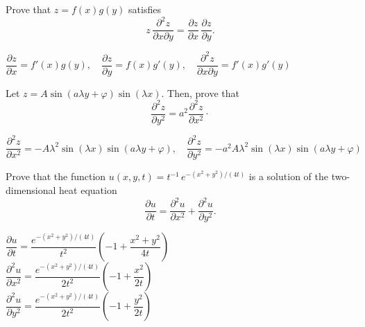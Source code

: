 \ifanalysis

\begin{Exercise}[difficulty = 3] Prove that $z=f(x)g(y)$ satisfies
$$z\, \dfrac{\partial^2 z}{\partial x \partial y} = \dfrac{\partial z}{\partial x }\,  \dfrac{\partial z}{\partial y }. $$ 
\end{Exercise}

\begin{Answer}

    $\dfrac{\partial z}{\partial x } = f'(x)g(y), \quad  \dfrac{\partial z}{\partial y } = f(x)g'(y), \quad \dfrac{\partial^2 z}{\partial x \partial y} = f'(x)g'(y)$
\end{Answer}

\ifanalysis\pagebreak\fi
\begin{Exercise}[difficulty = 3] Let $z = A\sin (a\lambda y+\varphi)\sin (\lambda x)$. Then, prove that
$$\dfrac{\partial^2 z}{\partial y^2}=a^2\dfrac{\partial^2 z}{\partial x^2}\cdot$$  
\end{Exercise}

\begin{Answer}
    $\dfrac{\partial^2 z}{\partial x^2} = -A \lambda^2 \sin \left(\lambda x \right)\sin (a\lambda y+\varphi), \quad \dfrac{\partial^2 z}{\partial y^2}= -a^2 A \lambda^2\sin \left(\lambda x \right)\sin (a\lambda y+\varphi)$
\end{Answer}

\begin{Exercise}[difficulty = 2] Prove that the function $u(x,y,t) = t^{-1}\, e^{-(x^2+y^2)/(4t)}$ is a solution of the two-dimensional heat equation
\[ \dfrac{\partial u}{\partial t} = \dfrac{\partial^2 u}{\partial x^2} + \dfrac{\partial^2 u}{\partial y^2}. \]
\end{Exercise}

\begin{Answer}

    $\dfrac{\partial u}{ \partial t} = \dfrac{e^{-(x^2+y^2)/(4t)}}{t^2} \left( -1 + \dfrac{x^2+y^2}{4t} \right)$ \\[0.2cm]
 $\dfrac{\partial^2 u}{ \partial x^2} = \dfrac{e^{-(x^2+y^2)/(4t)}}{2t^2} \left( -1 + \dfrac{x^2}{2t} \right)$\\[0.2cm]
 $\dfrac{\partial^2 u}{ \partial y^2} = \dfrac{e^{-(x^2+y^2)/(4t)}}{2t^2} \left( -1 + \dfrac{y^2}{2t} \right)$
\end{Answer}

